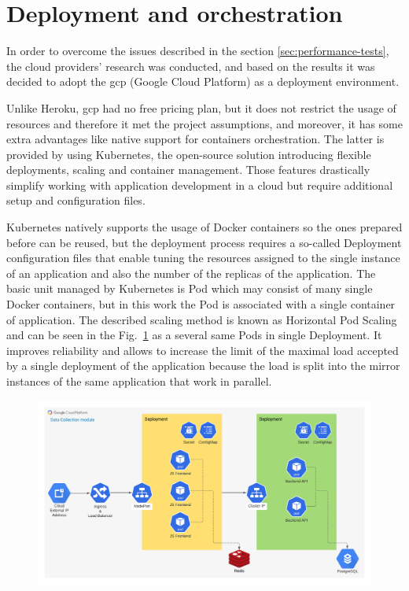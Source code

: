 \section{Deployment and orchestration}\label{sec:deployment-and-orchestration}
In order to overcome the issues described in the section \ref{sec:performance-tests}, the cloud providers' research was conducted, and based on the results it was decided to adopt the \gls{gcp} (Google Cloud Platform) as a deployment environment.

Unlike Heroku, \gls{gcp} had no free pricing plan, but it does not restrict the usage of resources and therefore it met the project assumptions, and moreover, it has some extra advantages like native support for containers orchestration.
The latter is provided by using Kubernetes, the open-source solution introducing flexible deployments, scaling and container management.
Those features drastically simplify working with application development in a cloud but require additional setup and configuration files.

Kubernetes natively supports the usage of Docker containers so the ones prepared before can be reused, but the deployment process requires a so-called Deployment configuration files that enable tuning the resources assigned to the single instance of an application and also the number of the replicas of the application.
The basic unit managed by Kubernetes is Pod which may consist of many single Docker containers, but in this work the Pod is associated with a single container of application.
The described scaling method is known as Horizontal Pod Scaling and can be seen in the Fig.~\ref{fig:gcp_diagram} as a several same Pods in single Deployment.
It improves reliability and allows to increase the limit of the maximal load accepted by a single deployment of the application because the load is split into the mirror instances of the same application that work in parallel.

\begin{figure}
    \includegraphics[width=\linewidth]{resources/gcp_diagram}
    \label{fig:gcp_diagram}
\end{figure}

